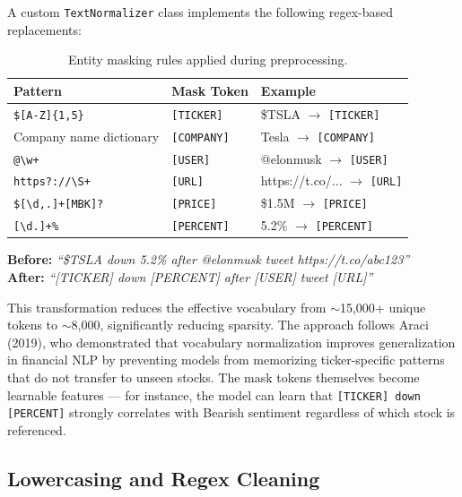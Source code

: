 \documentclass[11pt,a4paper]{article}
\begin{document}
A custom \texttt{TextNormalizer} class implements the following regex-based replacements:

\begin{table}[H]
\centering
\caption{Entity masking rules applied during preprocessing.}
\label{tab:masking}
\begin{tabular}{lll}
\toprule
\textbf{Pattern} & \textbf{Mask Token} & \textbf{Example} \\
\midrule
\texttt{\$[A-Z]\{1,5\}} & \texttt{[TICKER]} & \$TSLA $\rightarrow$ \texttt{[TICKER]} \\
Company name dictionary & \texttt{[COMPANY]} & Tesla $\rightarrow$ \texttt{[COMPANY]} \\
\texttt{@\textbackslash w+} & \texttt{[USER]} & @elonmusk $\rightarrow$ \texttt{[USER]} \\
\texttt{https?://\textbackslash S+} & \texttt{[URL]} & https://t.co/... $\rightarrow$ \texttt{[URL]} \\
\texttt{\$[\textbackslash d,.]+[MBK]?} & \texttt{[PRICE]} & \$1.5M $\rightarrow$ \texttt{[PRICE]} \\
\texttt{[\textbackslash d.]+\%} & \texttt{[PERCENT]} & 5.2\% $\rightarrow$ \texttt{[PERCENT]} \\
\bottomrule
\end{tabular}
\end{table}

\noindent\textbf{Before:} \textit{``\$TSLA down 5.2\% after @elonmusk tweet https://t.co/abc123''}\\
\textbf{After:} \textit{``[TICKER] down [PERCENT] after [USER] tweet [URL]''}

\vspace{0.3cm}
This transformation reduces the effective vocabulary from $\sim$15,000+ unique tokens to $\sim$8,000, significantly reducing sparsity. The approach follows Araci (2019), who demonstrated that vocabulary normalization improves generalization in financial NLP by preventing models from memorizing ticker-specific patterns that do not transfer to unseen stocks. The mask tokens themselves become learnable features --- for instance, the model can learn that \texttt{[TICKER] down [PERCENT]} strongly correlates with Bearish sentiment regardless of which stock is referenced.

\subsection{Lowercasing and Regex Cleaning}
\end{document}
